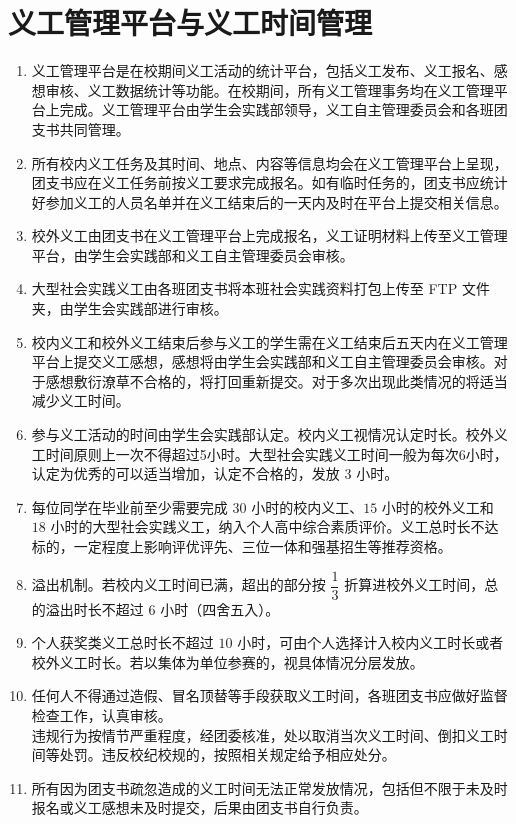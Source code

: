 \documentclass{article}
\begin{document}
\section{义工管理平台与义工时间管理}

\begin{enumerate}[resume, label=\heiti{\textbf{第\chinese*条}}, leftmargin=4em]
  \fangsong
  \item 义工管理平台是在校期间义工活动的统计平台，包括义工发布、义工报名、感想审核、义工数据统计等功能。在校期间，所有义工管理事务均在义工管理平台上完成。义工管理平台由学生会实践部领导，义工自主管理委员会和各班团支书共同管理。
  \item 所有校内义工任务及其时间、地点、内容等信息均会在义工管理平台上呈现，团支书应在义工任务前按义工要求完成报名。如有临时任务的，团支书应统计好参加义工的人员名单并在义工结束后的一天内及时在平台上提交相关信息。
  \item 校外义工由团支书在义工管理平台上完成报名，义工证明材料上传至义工管理平台，由学生会实践部和义工自主管理委员会审核。
  \item 大型社会实践义工由各班团支书将本班社会实践资料打包上传至 FTP 文件夹，由学生会实践部进行审核。
  \item 校内义工和校外义工结束后参与义工的学生需在义工结束后五天内在义工管理平台上提交义工感想，感想将由学生会实践部和义工自主管理委员会审核。对于感想敷衍潦草不合格的，将打回重新提交。对于多次出现此类情况的将适当减少义工时间。
  \item 参与义工活动的时间由学生会实践部认定。校内义工视情况认定时长。校外义工时间原则上一次不得超过5小时。大型社会实践义工时间一般为每次6小时，认定为优秀的可以适当增加，认定不合格的，发放 $3$ 小时。
  \item 每位同学在毕业前至少需要完成 $30$ 小时的校内义工、$15$ 小时的校外义工和 $18$ 小时的大型社会实践义工，纳入个人高中综合素质评价。义工总时长不达标的，一定程度上影响评优评先、三位一体和强基招生等推荐资格。
  \item 溢出机制。若校内义工时间已满，超出的部分按 $\dfrac13$ 折算进校外义工时间，总的溢出时长不超过 $6$ 小时（四舍五入）。
  \item 个人获奖类义工总时长不超过 $10$ 小时，可由个人选择计入校内义工时长或者校外义工时长。若以集体为单位参赛的，视具体情况分层发放。
  \item 任何人不得通过造假、冒名顶替等手段获取义工时间，各班团支书应做好监督检查工作，认真审核。\\
  违规行为按情节严重程度，经团委核准，处以取消当次义工时间、倒扣义工时间等处罚。违反校纪校规的，按照相关规定给予相应处分。
  \item 所有因为团支书疏忽造成的义工时间无法正常发放情况，包括但不限于未及时报名或义工感想未及时提交，后果由团支书自行负责。

\end{enumerate}
\end{document}
